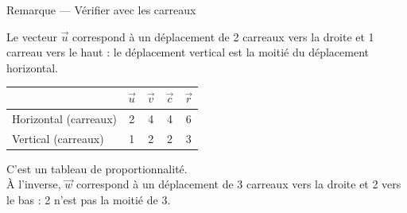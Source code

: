 \documentclass[border=4pt]{standalone}
\begin{document}
\begin{minipage}{16cm}\large {\color{gris}\Large Remarque — Vérifier avec les carreaux}\par\vspace{4pt}Le vecteur $\vec{u}$ correspond à un déplacement de 2 carreaux vers la droite et 1 carreau vers le haut : le déplacement vertical est la moitié du déplacement horizontal.\par {\normalsize\begin{tabular}{l|cccc} & $\vec{u}$ & $\vec{v}$ & $\vec{c}$ & $\vec{r}$\\\hline Horizontal (carreaux) & 2 & 4 & 4 & 6\\ Vertical (carreaux) & 1 & 2 & 2 & 3\end{tabular}}\par C'est un tableau de proportionnalité.\\ À l'inverse, $\vec{w}$ correspond à un déplacement de 3 carreaux vers la droite et 2 vers le bas : 2 n'est pas la moitié de 3.\end{minipage}
\end{document}
